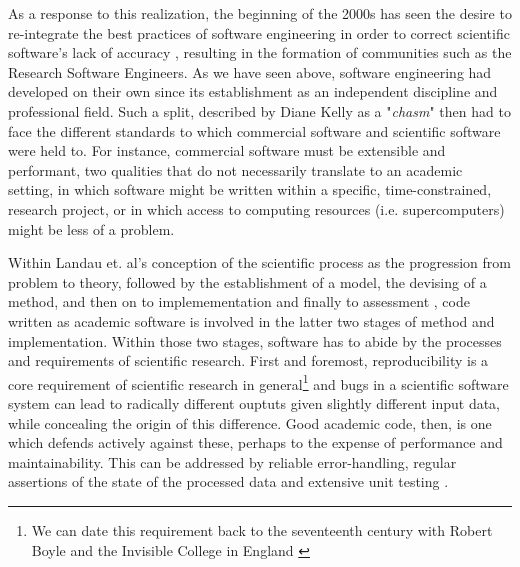 As a response to this realization, the beginning of the 2000s has seen the desire to re-integrate the best practices of software engineering in order to correct scientific software's lack of accuracy \citep{hatton_how_1994}, resulting in the formation of communities such as the Research Software Engineers\citep{woolston_why_2022}. As we have seen above, software engineering had developed on their own since its establishment as an independent discipline and professional field. Such a split, described by Diane Kelly as a "\emph{chasm}" \citep{kelly_software_2007} then had to face the different standards to which commercial software and scientific software were held to. For instance, commercial software must be extensible and performant, two qualities that do not necessarily translate to an academic setting, in which software might be written within a specific, time-constrained, research project, or in which access to computing resources (i.e. supercomputers) might be less of a problem.

Within Landau et. al's conception of the scientific process as the progression from problem to theory, followed by the establishment of a model, the devising of a method, and then on to implemementation and finally to assessment \citep{landau_survey_2011}, code written as academic software is involved in the latter two stages of  method and implementation. Within those two stages, software has to abide by the processes and requirements of scientific research. First and foremost, reproducibility is a core requirement of scientific research in general\footnote{We can date this requirement back to the seventeenth century with Robert Boyle and the Invisible College in England \citep{leveque_reproducible_2012}} and bugs in a scientific software system can lead to radically different ouptuts given slightly different input data, while concealing the origin of this difference. Good academic code, then, is one which defends actively against these, perhaps to the expense of performance and maintainability. This can be addressed by reliable error-handling, regular assertions of the state of the processed data and extensive unit testing \citep{wilson_best_2014}.

